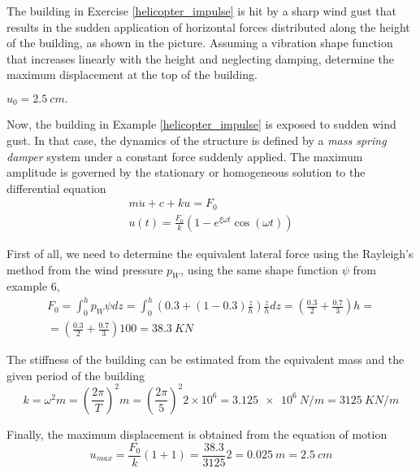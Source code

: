 
\begin{Exercise}[label={wind_gust_impulse}]
The building in Exercise \ref{helicopter_impulse} is hit by a sharp wind gust that results in the sudden application of horizontal forces distributed along the height of the building, as shown in the picture. Assuming a vibration shape function that increases linearly with the height and neglecting damping, determine the maximum displacement at the top of the building.

\begin{center}
\end{center}

\shortAnswer $u_0 = \SI{2.5}{cm}.$
\end{Exercise}



\begin{Answer}[ref={wind_gust_impulse}]
Now, the building in Example \ref{helicopter_impulse} is exposed to sudden wind gust. In that case, the dynamics of the structure is defined by a \emph{mass spring damper} system under a constant force suddenly applied. The maximum amplitude is governed by the stationary or homogeneous solution to the differential equation
\begin{align*}
m\ddot{u} + c + ku = F_0 \\
u(t) = \frac{F_0}{k}(1 -e^{\xi\omega t}\cos(\omega t))
\end{align*}

First of all, we need to determine the equivalent lateral force using the Rayleigh's method from the wind pressure $p_W$, using the same shape function $\psi$ from example 6,
\begin{align*}
F_0 = \int_0^h p_W\psi dz = \int_0^h \left(0.3 + (1-0.3)\frac{z}{h}\right)\frac{z}{h}dz = \left(\frac{0.3}{2} + \frac{0.7}{3}\right)h = \\
= \left(\frac{0.3}{2} + \frac{0.7}{3}\right)100 = \SI{38.3}{KN}
\end{align*}

The stiffness of the building can be estimated from the equivalent mass and the given period of the building
$$
k = \omega^2m = \left(\frac{2\pi}{T}\right)^2m = \left(\frac{2\pi}{5}\right)^2 2\times 10^6 = \SI{3.125e6}{N/m} = \SI{3125}{KN/m}
$$

Finally, the maximum displacement is obtained from the equation of motion
$$
u_{max} = \frac{F_0}{k}(1+1) = \frac{38.3}{3125}2 = \SI{0.025}{m} = \SI{2.5}{cm}
$$
\end{Answer}
